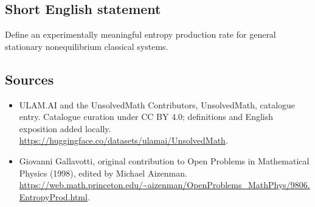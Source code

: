 \documentclass[11pt]{article}
\begin{document}
\subsection{Short English statement}
Define an experimentally meaningful entropy production rate for general stationary nonequilibrium classical systems.
\subsection{Sources}
\begin{itemize}
\item[\hypertarget{source:statement:1}{S1}] ULAM.AI and the UnsolvedMath Contributors, UnsolvedMath, catalogue entry. Catalogue curation under CC BY 4.0; definitions and English exposition added locally.
\url{https://huggingface.co/datasets/ulamai/UnsolvedMath}.
\item[\hypertarget{source:statement:2}{S2}] Giovanni Gallavotti, original contribution to Open Problems in Mathematical Physics (1998), edited by Michael Aizenman.
\url{https://web.math.princeton.edu/~aizenman/OpenProblems_MathPhys/9806.EntropyProd.html}.
\end{itemize}
\label{end:statement}
\end{document}
